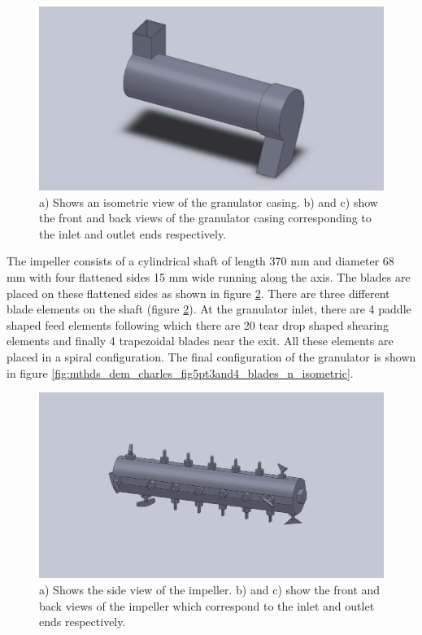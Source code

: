\documentclass[preprint,11pt,authoryear]{elsarticle}
\begin{document}
	      \begin{figure}[H]
	      \centering
	      \includegraphics[scale=0.2]{shell_final_pic.pdf}
	      \caption{ a) Shows an isometric view of the granulator casing. b) and c) show the front and back views of the granulator casing corresponding to the inlet and outlet ends respectively.}
	      \label{fig:mthdsDemCharlesGranShell}
	      \end{figure}
	   
	    \par  The impeller consists of a cylindrical shaft of length 370 mm and diameter 68 mm with four flattened sides 15 mm wide running along the axis. The blades are placed on these flattened sides as shown in figure \ref{fig:mthds_dem_charles_impeller}. There are three different blade elements on the shaft (figure \ref{fig:mthds_dem_charles_impeller}). At the granulator inlet, there are 4 paddle shaped feed elements following which there are 20 tear drop shaped shearing elements  and finally 4 trapezoidal blades near the exit. All these elements are placed in a spiral configuration. The final configuration of the granulator is shown in figure \ref{fig:mthds_dem_charles_fig5pt3and4_blades_n_isometric}.
	
	      \begin{figure}[H]
	      \centering
	      \includegraphics[scale=0.2]{impeller_final_pic.pdf}
	      \caption{a) Shows the side view of the impeller. b) and c) show the front and back views of the impeller which correspond to the inlet and outlet ends respectively.}
	      \label{fig:mthds_dem_charles_impeller}
	      \end{figure}    
	    
\end{document}
